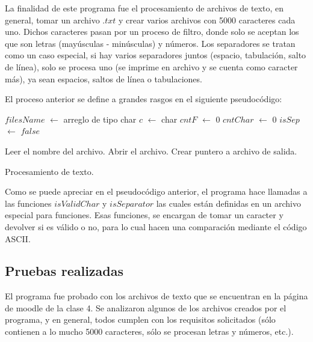 \documentclass[12pt]{article}
\begin{document}
La finalidad de este programa fue el procesamiento de archivos de texto, en general, tomar un archivo $.txt$ y crear varios archivos con 5000 caracteres cada uno. Dichos caracteres pasan por un proceso de filtro, donde solo se aceptan los que son letras (mayúsculas - minúsculas) y números. Los separadores se tratan como un caso especial, si hay varios separadores juntos (espacio, tabulación, salto de línea), solo se procesa uno (se imprime en archivo y se cuenta como caracter más), ya sean espacios, saltos de línea o tabulaciones.

El proceso anterior se define a grandes rasgos en el siguiente pseudocódigo:

\begin{algorithm}[H]
	$filesName$ $\leftarrow$ arreglo de tipo char\;
	$c$ $\leftarrow$ char\;
	$cntF$ $\leftarrow$ 0\;
	$cntChar$ $\leftarrow$ 0\;
	$isSep$ $\leftarrow$ $false$\;
	
	Leer el nombre del archivo.\;
	Abrir el archivo.\;
	Crear puntero a archivo de salida.\;
	
	
	
	\caption{Procesamiento de texto.}
	
\end{algorithm}

Como se puede apreciar en el pseudocódigo anterior, el programa hace llamadas a las funciones $isValidChar$ y $isSeparator$ las cuales están definidas en un archivo especial para funciones. Esas funciones, se encargan de tomar un caracter y devolver si es válido o no, para lo cual hacen una comparación mediante el código ASCII.

\subsection{Pruebas realizadas}

El programa fue probado con los archivos de texto que se encuentran en la página de moodle de la clase 4. Se analizaron algunos de los archivos creados por el programa, y en general, todos cumplen con los requisitos solicitados (sólo contienen a lo mucho 5000 caracteres, sólo se procesan letras y números, etc.).\\
\end{document}
